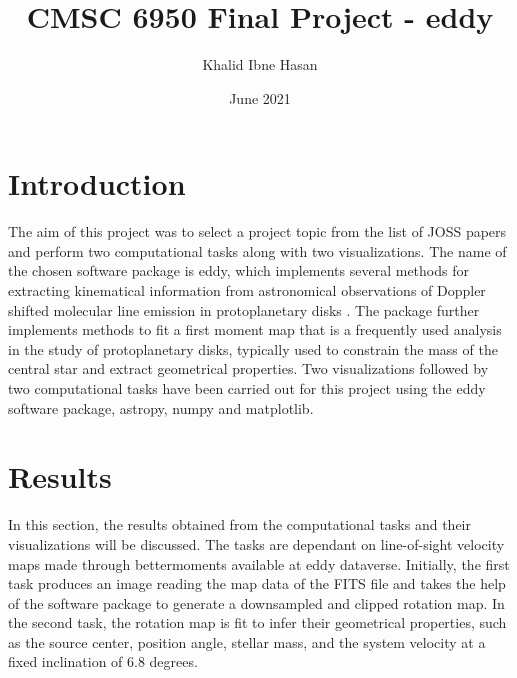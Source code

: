 \documentclass{article}
\title{CMSC 6950 Final Project - eddy}
\author{Khalid Ibne Hasan }
\date{June 2021}
\begin{document}
\maketitle

\section{Introduction}
The aim of this project was to select a project topic from the list of JOSS papers and perform two computational tasks along with two visualizations. The name of the chosen software package is eddy, which implements several methods for extracting kinematical information from astronomical observations of Doppler shifted molecular line emission in protoplanetary disks \cite{Teague2019}. The package further implements methods to fit a first moment map that is a frequently used analysis in the study of protoplanetary disks, typically used to constrain the mass of the central star and extract geometrical properties. Two visualizations followed by two computational tasks have been carried out for this project using the eddy software package, astropy, numpy and matplotlib.

\section{Results}
In this section, the results obtained from the computational tasks and their visualizations will be discussed. The tasks are dependant on line-of-sight velocity maps made through bettermoments available at eddy dataverse. Initially, the first task produces an image reading the map data of the FITS file and takes the help of the software package to generate a downsampled and clipped rotation map. In the second task, the rotation map is fit to infer their geometrical properties, such as the source center, position angle, stellar mass, and the system velocity at a fixed inclination of 6.8 degrees. 
\end{document}

